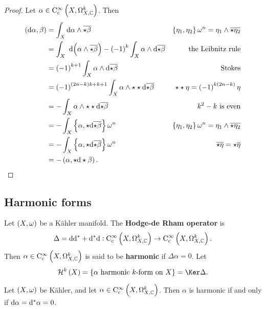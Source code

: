 
\begin{proof}
Let $ \alpha \in \C_\c^\infty\br{X, \Omega_{X, \CC}^k} $. Then
\begin{align*}
\br{\d\alpha, \beta}
& = \int_X \d\alpha \wedge \overline{\star\beta} & \cbr{\eta_1, \eta_2}\omega^n = \eta_1 \wedge \overline{\star\eta_2} \\
& = \intd{X}{}{}{\br{\alpha \wedge \overline{\star\beta}}} - \br{-1}^k\int_X \alpha \wedge \d\overline{\star\beta} & \text{the Leibnitz rule} \\
& = \br{-1}^{k + 1}\int_X \alpha \wedge \d\overline{\star\beta} & \text{Stokes} \\
& = \br{-1}^{\br{2n - k}k + k + 1}\int_X \alpha \wedge \star\star\d\overline{\star\beta} & \star\star\eta = \br{-1}^{k\br{2n - k}}\eta \\
& = -\int_X \alpha \wedge \star\star\d\overline{\star\beta} & k^2 - k \ \text{is even} \\
& = -\int_X \cbr{\alpha, \star\d\overline{\star\beta}}\omega^n & \cbr{\eta_1, \eta_2}\omega^n = \eta_1 \wedge \overline{\star\eta_2} \\
& = -\int_X \cbr{\alpha, \star\d\overline{\star\beta}}\omega^n & \overline{\star\eta} = \star\overline{\eta} \\
& = -\br{\alpha, \star\d\star\beta}.
\end{align*}
\end{proof}

\pagebreak

\subsection{Harmonic forms}

\begin{definition}
Let $ \br{X, \omega} $ be a K\"ahler manifold. The \textbf{Hodge-de Rham operator} is
$$ \Delta = \d\d^* + \d^*\d : \C_\c^\infty\br{X, \Omega_{X, \CC}^k} \to \C_\c^\infty\br{X, \Omega_{X, \CC}^k}. $$
Then $ \alpha \in \C_\c^\infty\br{X, \Omega_{X, \CC}^k} $ is said to be \textbf{harmonic} if $ \Delta\alpha = 0 $. Let
$$ \HHH^k\br{X} = \cbr{\alpha \ \text{harmonic $ k $-form on} \ X} = \Ker \Delta. $$
\end{definition}

\begin{lemma}
\label{lem:6.13}
Let $ \br{X, \omega} $ be K\"ahler, and let $ \alpha \in \C_\c^\infty\br{X, \Omega_{X, \CC}^k} $. Then $ \alpha $ is harmonic if and only if $ \mathrm{d}\alpha = \mathrm{d}^*\alpha = 0 $.
\end{lemma}

